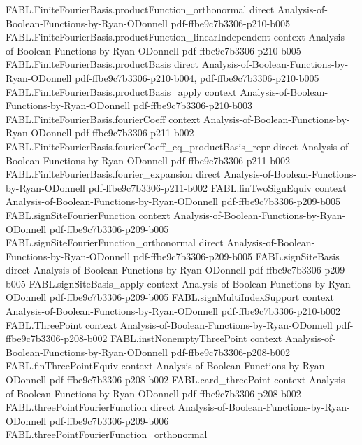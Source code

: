 \begin{theorem}
  {FABL.FiniteFourierBasis.productFunction_orthonormal}
  {direct}
  {Analysis-of-Boolean-Functions-by-Ryan-ODonnell}
  {pdf-ffbe9c7b3306-p210-b005}
\proofstep
  {FABL.FiniteFourierBasis.productFunction_linearIndependent}
  {context}
  {Analysis-of-Boolean-Functions-by-Ryan-ODonnell}
  {pdf-ffbe9c7b3306-p210-b005}
\proofstep
  {FABL.FiniteFourierBasis.productBasis}
  {direct}
  {Analysis-of-Boolean-Functions-by-Ryan-ODonnell}
  {pdf-ffbe9c7b3306-p210-b004,
    pdf-ffbe9c7b3306-p210-b005}
\proofstep
  {FABL.FiniteFourierBasis.productBasis_apply}
  {context}
  {Analysis-of-Boolean-Functions-by-Ryan-ODonnell}
  {pdf-ffbe9c7b3306-p210-b003}
\proofstep
  {FABL.FiniteFourierBasis.fourierCoeff}
  {context}
  {Analysis-of-Boolean-Functions-by-Ryan-ODonnell}
  {pdf-ffbe9c7b3306-p211-b002}
\proofstep
  {FABL.FiniteFourierBasis.fourierCoeff_eq_productBasis_repr}
  {direct}
  {Analysis-of-Boolean-Functions-by-Ryan-ODonnell}
  {pdf-ffbe9c7b3306-p211-b002}
\proofstep
  {FABL.FiniteFourierBasis.fourier_expansion}
  {direct}
  {Analysis-of-Boolean-Functions-by-Ryan-ODonnell}
  {pdf-ffbe9c7b3306-p211-b002}
\proofstep
  {FABL.finTwoSignEquiv}
  {context}
  {Analysis-of-Boolean-Functions-by-Ryan-ODonnell}
  {pdf-ffbe9c7b3306-p209-b005}
\proofstep
  {FABL.signSiteFourierFunction}
  {context}
  {Analysis-of-Boolean-Functions-by-Ryan-ODonnell}
  {pdf-ffbe9c7b3306-p209-b005}
\proofstep
  {FABL.signSiteFourierFunction_orthonormal}
  {direct}
  {Analysis-of-Boolean-Functions-by-Ryan-ODonnell}
  {pdf-ffbe9c7b3306-p209-b005}
\proofstep
  {FABL.signSiteBasis}
  {direct}
  {Analysis-of-Boolean-Functions-by-Ryan-ODonnell}
  {pdf-ffbe9c7b3306-p209-b005}
\proofstep
  {FABL.signSiteBasis_apply}
  {context}
  {Analysis-of-Boolean-Functions-by-Ryan-ODonnell}
  {pdf-ffbe9c7b3306-p209-b005}
\proofstep
  {FABL.signMultiIndexSupport}
  {context}
  {Analysis-of-Boolean-Functions-by-Ryan-ODonnell}
  {pdf-ffbe9c7b3306-p210-b002}
\proofstep
  {FABL.ThreePoint}
  {context}
  {Analysis-of-Boolean-Functions-by-Ryan-ODonnell}
  {pdf-ffbe9c7b3306-p208-b002}
\proofstep
  {FABL.instNonemptyThreePoint}
  {context}
  {Analysis-of-Boolean-Functions-by-Ryan-ODonnell}
  {pdf-ffbe9c7b3306-p208-b002}
\proofstep
  {FABL.finThreePointEquiv}
  {context}
  {Analysis-of-Boolean-Functions-by-Ryan-ODonnell}
  {pdf-ffbe9c7b3306-p208-b002}
\proofstep
  {FABL.card_threePoint}
  {context}
  {Analysis-of-Boolean-Functions-by-Ryan-ODonnell}
  {pdf-ffbe9c7b3306-p208-b002}
\proofstep
  {FABL.threePointFourierFunction}
  {direct}
  {Analysis-of-Boolean-Functions-by-Ryan-ODonnell}
  {pdf-ffbe9c7b3306-p209-b006}
\proofstep
  {FABL.threePointFourierFunction_orthonormal}

\end{theorem}
